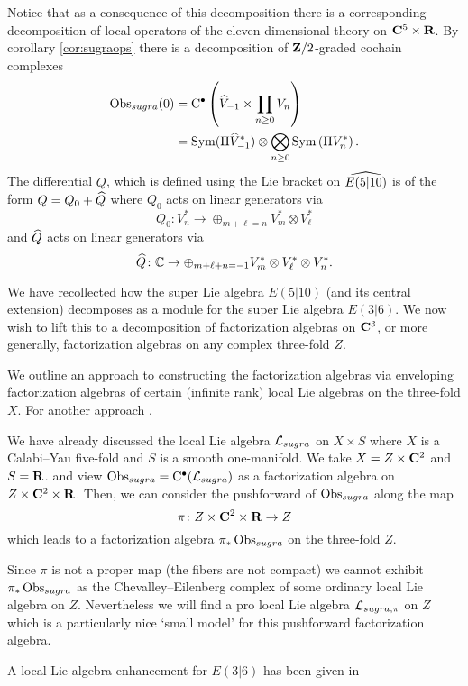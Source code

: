 \documentclass[11pt]{amsart}
\begin{document}
Notice that as a consequence of this decomposition there is a corresponding decomposition of local operators of the eleven-dimensional theory on $\C^5 \times \R$. 
By corollary \ref{cor:sugraops} there is a decomposition of $\Z/2$-graded cochain complexes 
\begin{align*}
\Obs_{sugra} (0) & = \clie^\bu \left( \Hat{V}_{-1} \times \prod_{n \geq 0} V_n \right) \\
& = \Sym(\Pi \Hat{V}^*_{-1}) \otimes \bigotimes_{n \geq 0} \Sym\left(\Pi V^*_n\right) .
\end{align*}
The differential $Q$, which is defined using the Lie bracket on $\Hat{E(5|10)}$ is of the form
$Q = Q_0 + \Hat{Q}$ where $Q_0$ acts on linear generators via
\[
Q_0 \colon V^*_n \to \oplus_{m + \ell = n} V^*_m \otimes V^*_\ell
\]
and $\Hat{Q}$ acts on linear generators via
\[
\Hat{Q} \colon \CC \to \oplus_{m + \ell + n = -1} V^*_m \otimes V^*_\ell \otimes V^*_n .
\]

\parsec[s:locallieE510]

We have recollected how the super Lie algebra $E(5|10)$ (and its central extension) decomposes as a module for the super Lie algebra $E(3|6)$. 
We now wish to lift this to a decomposition of factorization algebras on $\C^3$, or more generally, factorization algebras on any complex three-fold $Z$. 

We outline an approach to constructing the factorization algebras via enveloping factorization algebras of certain (infinite rank) local Lie algebras on the three-fold $X$. 
For another approach . 

We have already discussed the local Lie algebra $\cL_{sugra}$ on $X \times S$ where $X$ is a Calabi--Yau five-fold and $S$ is a smooth one-manifold. 
We take $X = Z \times \C^2$ and $S = \R$. 
and view $\Obs_{sugra} = \clie^\bu(\cL_{sugra})$ as a factorization algebra on $Z \times \C^2 \times \R$. 
Then, we can consider the pushforward of $\Obs_{sugra}$ along the map
\[
\pi \colon Z \times \C^2 \times \R \to Z 
\]
which leads to a factorization algebra $\pi_* \Obs_{sugra}$ on the three-fold $Z$. 

Since $\pi$ is not a proper map (the fibers are not compact) we cannot exhibit $\pi_*\Obs_{sugra}$ as the Chevalley--Eilenberg complex of some ordinary local Lie algebra on $Z$. 
Nevertheless we will find a pro local Lie algebra $\cL_{sugra,\pi}$ on $Z$ which is a particularly nice `small model' for this pushforward factorization algebra.

A local Lie algebra enhancement for $E(3|6)$ has been given in \cite{SWsuca6d} 
\end{document}
